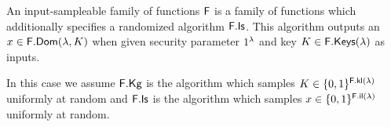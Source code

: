 \begin{defn}
	An input-sampleable family of functions $\mathsf{F}$ is a family of functions which additionally specifies a randomized algorithm $\mathsf{F}.\mathsf{Is}$.
	This algorithm outputs an $x\in\mathsf{F}.\mathsf{Dom}(\lambda,K)$ when given security parameter $1^\lambda$ and key $K\in\mathsf{F}.\mathsf{Keys}(\lambda)$ as inputs.  
\end{defn}

In this case we assume $\mathsf{F}.\mathsf{Kg}$ is the algorithm which samples $K\in\{0,1\}^{\mathsf{F}.\mathsf{kl}(\lambda)}$ uniformly at random and $\mathsf{F}.\mathsf{Is}$ is the algorithm which samples $x\in\{0,1\}^{\mathsf{F}.\mathsf{il}(\lambda)}$ uniformly at random. 

\fi